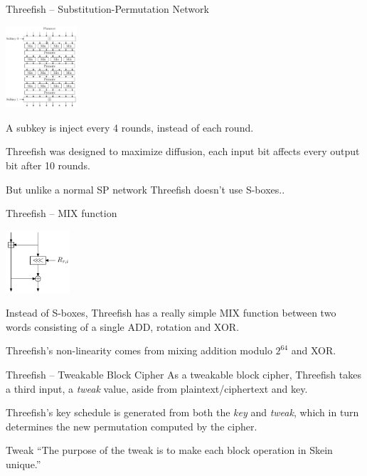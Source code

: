 \documentclass{beamer}
\begin{document}
\begin{frame}{Threefish -- Substitution-Permutation Network}

	\begin{center}\includegraphics[width=100px]{skein-512}\end{center}

	A subkey is inject every 4 rounds, instead of each round.

	\vspace{2mm}
	Threefish was designed to maximize diffusion, each input bit affects every output bit after 10 rounds.

	\vspace{2mm}
	But unlike a normal SP network Threefish doesn't use S-boxes..

\end{frame}

\begin{frame}{Threefish -- MIX function}

	\begin{center}\includegraphics[width=90px]{mix}\end{center}

	Instead of S-boxes, Threefish has a really simple MIX function between two words consisting of a single ADD, rotation and XOR.

	\vspace{2mm}
	Threefish's non-linearity comes from mixing addition modulo $2^{64}$ and XOR.

\end{frame}

\begin{frame}{Threefish -- Tweakable Block Cipher}
	As a tweakable block cipher, Threefish takes a third input, a \emph{tweak} value, aside from plaintext/ciphertext and key.

	\vspace{2mm}
	Threefish's key schedule is generated from both the \emph{key} and \emph{tweak}, which in turn determines the new permutation computed by the cipher.

	\vspace{2mm}
	\begin{block}{Tweak}
		``The purpose of the tweak is to make each block operation in Skein unique.''
	\end{block}
\end{frame}
\end{document}
